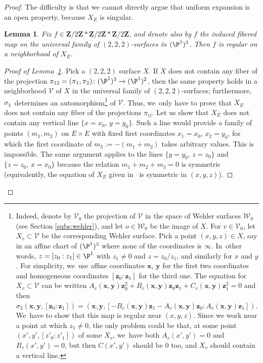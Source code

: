 \documentclass[JEP,XML,SOM,Unicode,published]{cedram}
\def\Z{\mathbf{Z}}
\newcommand{\bfx}{\boldsymbol{x}}
\newcommand{\bfy}{\boldsymbol{y}}
\newcommand{\bfz}{\boldsymbol{z}}
\newcommand{\cW}{\mathcal{W}}
\theoremstyle{plain}
\newtheorem{lem}[thm]{Lemma}
\theoremstyle{definition}
\begin{document}
\begin{proof}
The difficulty is that we cannot directly argue that uniform expansion is an open property, because
$X_E$ is singular.

\begin{lem}\label{lem:regular}
Fix $f\in \Z/2\Z\ast\Z/2\Z\ast\Z/2\Z$, and denote also by $f$ the induced fibered map on
the universal family of $(2,2,2)$-surfaces in $(\P^1)^3$.
Then $f$ is regular on a neighborhood of $X_E$.
\end{lem}

\begin{proof}[Proof of Lemma~\ref{lem:regular}] Pick a $(2,2,2)$ surface $X$. If $X$ does not contain any fiber
of the projection $\pi_{12}=(\pi_1,\pi_2)\colon (\P^1)^3\to (\P^1)^2$, then the same property holds in a neighborhood $\mathcal V$ of $X$ in the universal family of $(2,2,2)$-surfaces; furthermore, $\sigma_3$~determines an automorphism\footnote{Indeed,
denote by
${\mathcal{V}}_0$ the projection of $\mathcal V$ in the space of Wehler surfaces $ \cW_0$ (see Section \ref{subs:wehler}),
and let $o\in \cW_0$ be the image of $X$.
For $v\in {\mathcal{V}}_0$, let $X_v \subset {\mathcal V}$ be the corresponding Wehler surface.
Pick a point $(x,y,z)\in X$, say in an affine chart of $(\P^1)^3$ where none of the coordinates is $\infty$. In~other words, $z=[z_0:z_1]\in \P^1$ with $z_1\neq 0$ and $z=z_0/z_1$, and similarly for $x$ and $y$.
For simplicity, we~use affine coordinates $\bfx$, $\bfy$ for the first two coordinates and homogeneous coordinates $[\bfz_0:\bfz_1]$ for the third one. The equation for $X_v\subset \mathcal{V}$ can be written $A_v (\bfx,\bfy)\bfz_0^2+B_v(\bfx,\bfy)\bfz_0\bfz_1+C_v(\bfx,\bfy)\bfz_1^2=0$ and then $\sigma_3(\bfx, \bfy, [\bfz_0:\bfz_1])= (\bfx, \bfy, [-B_v(\bfx,\bfy) \bfz_1-A_v (\bfx, \bfy)\bfz_0 : A_v(\bfx,\bfy)\bfz_1])$. We~have to show that this map is regular near $(x,y,z)$. Since we work near a point at which $z_1\neq 0$, the only problem could be that, at some point $(x',y',[z'_0:z'_1])$ of some $X_v$, we~have both $A_v(x',y')=0$ and $B_v(x',y')=0$, but then $C(x',y')$ should be $0$ too, and $X_v$ should contain a vertical line.} of $\mathcal V$.
Thus, we~only have to prove that $X_E$ does not contain any fiber of the projections $\pi_{ij}$.
Let us show that $X_E$ does not contain any vertical line $\{x=x_0,\, y=y_0\}$. Such a line would provide a family of points $(m_1,m_2)$ on $E\times E$ with fixed first coordinates $x_1=x_0$, $x_2=y_0$, for which the first coordinate of $m_3:=-(m_1+m_2)$ takes arbitrary values. This is impossible. The same argument applies to the lines $\{y=y_0,\, z=z_0\}$ and $\{z=z_0,\, x=x_0\}$ because the relation $m_1+m_2+m_3=0$ is symmetric (equivalently, the equation of $X_E$ given in~\cite[\S 8.2]{Cantat:Panorama-Synthese} is symmetric in $(x,y,z)$).
\end{proof}


\end{proof}
\end{document}
